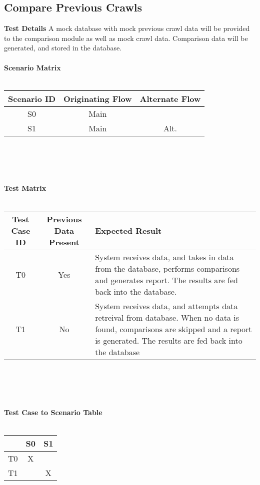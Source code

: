 \subsection{Compare Previous Crawls}
\textbf{Test Details}
A mock database with mock previous crawl data will be provided to the comparison module as well as mock crawl data.  Comparison data will be generated, and stored in the database.\\\\
\textbf{Scenario Matrix}\\\\
\begin{tabular}{|c|c c|}
	\hline
	Scenario ID & Originating Flow & Alternate Flow  \\ \hline \hline
	S0 & Main &  \\ \hline
	S1 & Main & Alt. \\ \hline
\end{tabular}\\\\\\\\
\textbf{Test Matrix}\\\\
\begin{tabularx}{\textwidth}{|c c X|}
	\hline
	\textbf{Test Case ID} & \bf{Previous Data Present} & \textbf{Expected Result}  \\ \hline
	T0 & Yes & System receives data, and takes in data from the database, performs comparisons and generates report. The results are fed back into the database. \\ \hline
	T1 & No & System receives data, and attempts data retreival from database.  When no data is found, comparisons are skipped and a report is generated.  The results are fed back into the database \\ \hline
\end{tabularx}\\\\\\\\
\textbf{Test Case to Scenario Table}\\\\
\begin{tabular}{|r||c|c|}
	\hline
	& S0 & S1 \\ \hline \hline
	T0 & X & \\ \hline
	T1 & & X \\ \hline
\end{tabular}

